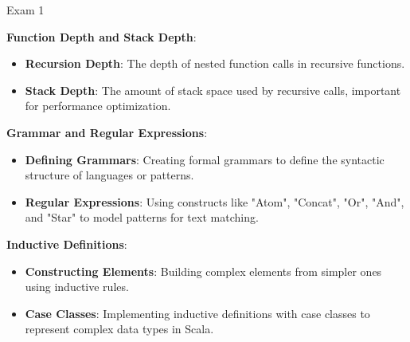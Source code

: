 \begin{examnotes}{Exam 1}
\begin{highlight}
        \textbf{Function Depth and Stack Depth}:
        \begin{itemize}
            \item \textbf{Recursion Depth}: The depth of nested function calls in recursive functions.
            \item \textbf{Stack Depth}: The amount of stack space used by recursive calls, important for performance optimization.
        \end{itemize}
    
        \textbf{Grammar and Regular Expressions}:
        \begin{itemize}
            \item \textbf{Defining Grammars}: Creating formal grammars to define the syntactic structure of languages or patterns.
            \item \textbf{Regular Expressions}: Using constructs like "Atom", "Concat", "Or", "And", and "Star" to model patterns for text matching.
        \end{itemize}
        
        \textbf{Inductive Definitions}:
        \begin{itemize}
            \item \textbf{Constructing Elements}: Building complex elements from simpler ones using inductive rules.
            \item \textbf{Case Classes}: Implementing inductive definitions with case classes to represent complex data types in Scala.
        \end{itemize}
    \end{highlight}
\end{examnotes}

